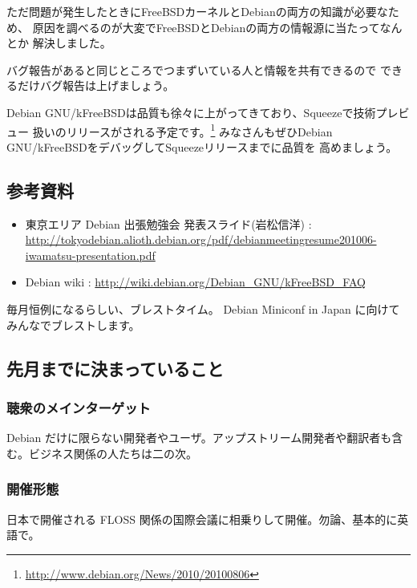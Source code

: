 \documentclass[mingoth,a4paper]{jsarticle}
\begin{document}
ただ問題が発生したときにFreeBSDカーネルとDebianの両方の知識が必要なため、
原因を調べるのが大変でFreeBSDとDebianの両方の情報源に当たってなんとか
解決しました。

バグ報告があると同じところでつまずいている人と情報を共有できるので
できるだけバグ報告は上げましょう。

Debian GNU/kFreeBSDは品質も徐々に上がってきており、Squeezeで技術プレビュー
扱いのリリースがされる予定です。\footnote{\url{http://www.debian.org/News/2010/20100806}}
みなさんもぜひDebian GNU/kFreeBSDをデバッグしてSqueezeリリースまでに品質を
高めましょう。

\subsection{参考資料}
\begin{itemize}
 \item 東京エリア Debian 出張勉強会 発表スライド(岩松信洋) : \url{http://tokyodebian.alioth.debian.org/pdf/debianmeetingresume201006-iwamatsu-presentation.pdf}
 \item Debian wiki : \url{http://wiki.debian.org/Debian\_GNU/kFreeBSD\_FAQ}
\end{itemize}


毎月恒例になるらしい、ブレストタイム。
Debian Miniconf in Japan に向けてみんなでブレストします。

\subsection{先月までに決まっていること}
\subsubsection{聴衆のメインターゲット}
Debian だけに限らない開発者やユーザ。アップストリーム開発者や翻訳者も含む。ビジネス関係の人たちは二の次。

\subsubsection{開催形態}
日本で開催される FLOSS 関係の国際会議に相乗りして開催。勿論、基本的に英語で。
\end{document}

